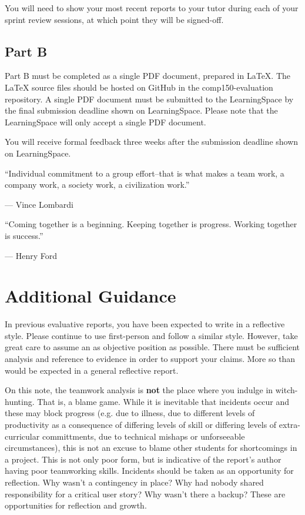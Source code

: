 \documentclass{../fal_assignment}
\begin{document}
You will need to show your most recent reports to your tutor during each of your sprint review sessions, at which point they will be signed-off.

\subsection*{Part B}

Part B must be completed as a single PDF document, prepared in LaTeX. The LaTeX source files should be hosted on GitHub in the comp150-evaluation repository. A single PDF document must be submitted to the LearningSpace by the final submission deadline shown on LearningSpace. Please note that the LearningSpace will only accept a single PDF document.

You will receive formal feedback three weeks after the submission deadline shown on LearningSpace.

\begin{marginquote}
    ``Individual commitment to a group effort--that is what makes a team work, a company work, a society work, a civilization work.''
    
    --- Vince Lombardi
    
        \marginquoterule
        
    ``Coming together is a beginning. Keeping together is progress. Working together is success.''
    
    --- Henry Ford 
\end{marginquote}
\section*{Additional Guidance}

In previous evaluative reports, you have been expected to write in a reflective style. Please continue to use first-person and follow a similar style. However, take great care to assume an as objective position as possible. There must be sufficient analysis and reference to evidence in order to support your claims. More so than would be expected in a general reflective report.

On this note, the teamwork analysis is \textbf{not} the place where you indulge in witch-hunting. That is, a blame game. While it is inevitable that incidents occur and these may block progress (e.g. due to illness, due to different levels of productivity as a consequence of differing levels of skill or differing levels of extra-curricular committments, due to technical mishaps or unforseeable circumstances), this is not an excuse to blame other students for shortcomings in a project. This is not only poor form, but is indicative of the report's author having poor teamworking skills. Incidents should be taken as an opportunity for reflection. Why wasn't a contingency in place? Why had nobody shared responsibility for a critical user story? Why wasn't there a backup? These are opportunities for reflection and growth.
\end{document}
